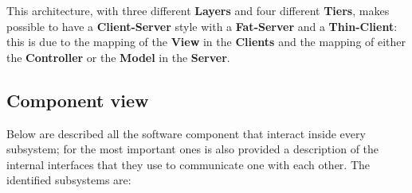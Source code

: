 This architecture, with three different \textbf{Layers} and four different \textbf{Tiers}, makes possible to have a \textbf{Client-Server} style with a \textbf{Fat-Server} and a \textbf{Thin-Client}: this is due to the mapping of the \textbf{View} in the \textbf{Clients} and the mapping of either the \textbf{Controller} or the \textbf{Model} in the \textbf{Server}.

\subsection{Component view}
Below are described all the software component that interact inside every subsystem; for the most important ones is also provided a description of the internal interfaces that they use to communicate one with each other.
The identified subsystems are:
